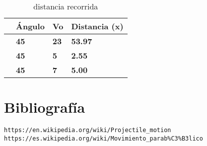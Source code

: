 \documentclass{article}
\begin{document}
\begin{table}[]
\centering
\caption{ distancia recorrida}
\label{my-label}
\begin{tabular}{|l|l|l|l|}
\hline
\textbf{} & \textbf{Ángulo} & \textbf{Vo} & \textbf{Distancia (x)} \\ \hline
\textbf{} & \textbf{45}     & \textbf{23} & \textbf{53.97}         \\ \hline
\textbf{} & \textbf{45}     & \textbf{5}  & \textbf{2.55}          \\ \hline
\textbf{} & \textbf{45}     & \textbf{7}  & \textbf{5.00}          \\ \hline
\end{tabular}
\end{table}

\section{Bibliografía}
\begin{verbatim}
https://en.wikipedia.org/wiki/Projectile_motion
https://es.wikipedia.org/wiki/Movimiento_parab%C3%B3lico
\end{verbatim}
\end{document}
